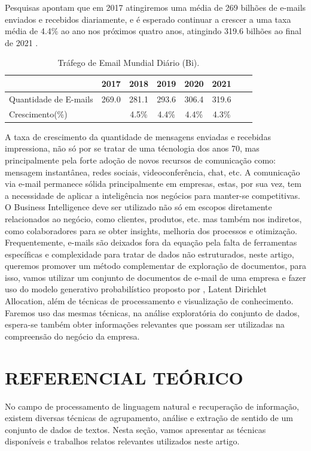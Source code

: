 \documentclass[12pt,a4paper]{article}
\begin{document}
Pesquisas apontam que em 2017 atingiremos uma média de 269 bilhões de e-mails enviados e recebidos diariamente, e é esperado continuar a crescer a uma taxa média de 4.4\% ao ano nos próximos quatro anos, atingindo 319.6 bilhões ao final de 2021 \cite{radicati2017}.

\begin{table}[h]
  \centering
  \begin{tabular}{l*{6}{c}r}
  &					2017 &	2018 &	2019 &	2020 &	2021 & \\
  \hline
  Quantidade de E-mails &			269.0 &	281.1 &	293.6 &	306.4 &	319.6 & \\
  Crescimento(\%) &  	&		4.5\% &	4.4\% &	4.4\% &	4.3\% & \\
  \hline
  \end{tabular}
  \caption{Tráfego de Email Mundial Diário  (Bi). \cite{radicati2017}}
\end{table}

A taxa de crescimento da quantidade de mensagens enviadas e recebidas impressiona, não só por se tratar de uma técnologia dos anos 70, mas principalmente pela forte adoção de novos recursos de comunicação como: mensagem instantânea, redes sociais, videoconferência, chat, etc. A comunicação via e-mail permanece sólida principalmente em empresas, estas, por sua vez, tem a necessidade de aplicar a inteligência nos negócios para manter-se competitivas. O Business Intelligence deve ser utilizado não só em escopos diretamente relacionados ao negócio, como clientes, produtos, etc. mas também nos indiretos, como colaboradores para se obter insights, melhoria dos processos e otimização. Frequentemente, e-mails são deixados fora da equação pela falta de ferramentas específicas e complexidade para tratar de dados não estruturados, neste artigo, queremos promover um método complementar de exploração de documentos, para isso, vamos utilizar um conjunto de documentos de e-mail de uma empresa e fazer uso do modelo generativo probabilístico proposto por , Latent Dirichlet Allocation, além de técnicas de processamento e visualização de conhecimento. Faremos uso das mesmas técnicas, na análise exploratória do conjunto de dados, espera-se também obter informações relevantes que possam ser utilizadas na compreensão do negócio da empresa.

\section{REFERENCIAL TEÓRICO}
No campo de processamento de linguagem natural e recuperação de informação, existem diversas técnicas de agrupamento, análise e extração de sentido de um conjunto de dados de textos. Nesta seção, vamos apresentar as técnicas disponíveis e trabalhos relatos relevantes utilizados neste artigo.
\end{document}
